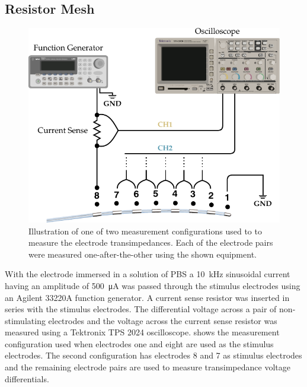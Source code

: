     \subsection{Resistor Mesh}

      \begin{figure}
        \centering
        \includegraphics{content/pt2/08-InterfaceParameters/graphics/measurement_resistorMesh}
        \caption{\label{fig:pt2-measurement_resistorMesh}Illustration of one of two measurement configurations used to to measure the electrode transimpedances. Each of the electrode pairs were measured one-after-the-other using the shown equipment.}
      \end{figure}

      With the electrode immersed in a solution of PBS a \SI{10}{\kilo\hertz} sinusoidal current having an amplitude of \SI{500}{\micro\ampere} was passed through the stimulus electrodes using an Agilent 33220A function generator.
      A current sense resistor was inserted in series with the stimulus electrodes.
      The differential voltage across a pair of non-stimulating electrodes and the voltage across the current sense resistor was measured using a Tektronix TPS 2024 oscilloscope.
       shows the measurement configuration used when electrodes one and eight are used as the stimulus electrodes.
      The second configuration has electrodes 8 and 7 as stimulus electrodes and the remaining electrode pairs are used to measure transimpedance voltage differentials.

